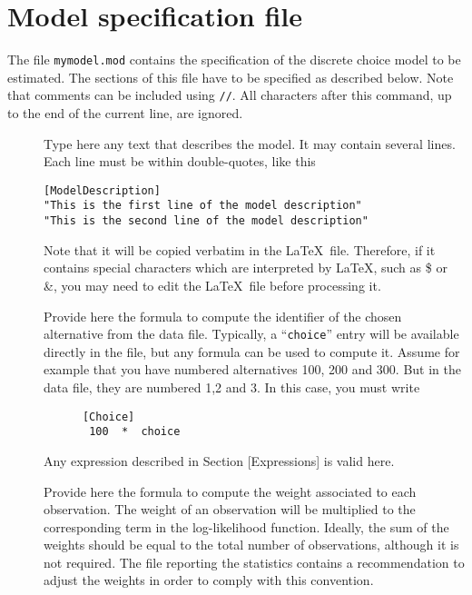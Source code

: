 \documentclass[12pt]{memoir}
\begin{document}
\section{Model specification file}
\label{sec:spec}

The file \texttt{mymodel.mod} contains the specification of the discrete choice
model to be estimated.
The sections of this file have to be specified as described below.
Note that comments can be included using \verb+//+. All characters
after this command, up to the end of the current line, are ignored.

\begin{description}

   \item[]
      Type here any text that describes the model. It may contain several lines. Each line must be within double-quotes, like this
{\footnotesize
\begin{verbatim}
[ModelDescription]
"This is the first line of the model description"
"This is the second line of the model description"
\end{verbatim}
}

Note that it will be copied verbatim in the \LaTeX\ file. Therefore, if it contains special characters which are interpreted by \LaTeX , such as \$ or \&, you may need to edit the \LaTeX\ file before processing it.

   \item[] Provide here the formula to compute the identifier of
      the chosen alternative from the data file. Typically, a ``\verb+choice+''
      entry will be available directly in the file, but any formula can be used to
      compute it. 
Assume for example that you have numbered alternatives 100, 200 and 300. But in the data file, they are numbered 1,2 and 3. In this case, you must write 

      \small
{\footnotesize
      \begin{verbatim}
      [Choice]
       100  *  choice  
      \end{verbatim}
}
      \normalsize
 Any expression  described in Section [Expressions] is valid here.

   \item[] Provide here the formula to compute the
      weight associated to each observation. The weight of an observation
      will be multiplied to the corresponding term in the log-likelihood
      function. Ideally, the sum of the weights should be equal to the
      total number of observations, although it is not required. The file
      reporting the statistics contains a recommendation to adjust the
      weights in order to comply with this convention.


\end{description}
\end{document}
